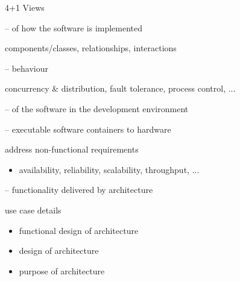 \documentclass{slide}
\begin{document}
\begin{frame}{4+1 Views}

\Large{
\begin{description}
    \item<1->[Logical] --  of how the software is implemented
    \begin{itemize}
        \large{\item[$\bullet$] components/classes, relationships, interactions}
    \end{itemize}
    \item<2->[Process] --  behaviour
    \begin{itemize}
        \large{\item[$\bullet$] concurrency \& distribution, fault tolerance, process control, ...}
    \end{itemize}
    \item<3->[Development] --  of the software in the development environment
    \item<4->[Physical] --  executable software containers to hardware
    \begin{itemize}
        \large{\item[$\bullet$] address non-functional requirements}
        \begin{itemize}
            \item[$\bullet$] availability, reliability, scalability, throughput, ...
        \end{itemize}
    \end{itemize}
    \item<5->[Scenario] --  functionality delivered by architecture
    \begin{itemize}
        \large{\item[$\bullet$] use case details}
        \begin{itemize}
            \item[$\bullet$]  functional design of architecture
            \item[$\bullet$]  design of architecture
            \item[$\bullet$]  purpose of architecture
        \end{itemize}
    \end{itemize}
\end{description}
}

\end{frame}
\end{document}
